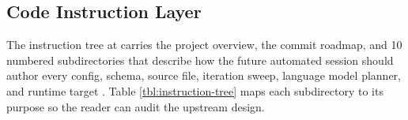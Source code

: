 %
%

\begin{sectionaccent}

\subsection{Code Instruction Layer}
\label{sec:methods-instructions}

The instruction tree at  carries the project
overview, the commit roadmap, and 10 numbered subdirectories that
describe how the future automated session should author every config,
schema, source file, iteration sweep, language model planner, and
runtime target \cite{kawchak_2026_humanoid_instructions}. Table
\ref{tbl:instruction-tree} maps each subdirectory to its purpose so
the reader can audit the upstream design.


\end{sectionaccent}
